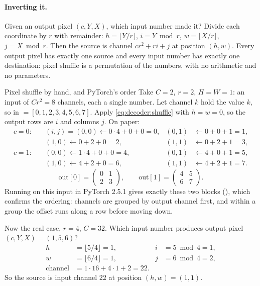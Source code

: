\paragraph{Inverting it.} Given an output pixel $(c, Y, X)$, which input number made it? Divide each
coordinate by $r$ with remainder: $h = \lfloor Y/r \rfloor$, $i = Y \bmod r$, $w = \lfloor X/r \rfloor$,
$j = X \bmod r$. Then the source is channel $c r^2 + r i + j$ at position $(h, w)$. Every output pixel
has exactly one source and every input number has exactly one destination: pixel shuffle is a
permutation of the numbers, with no arithmetic and no parameters.

\begin{worked}[label={we:decoder:shuffle}]{Pixel shuffle by hand, and PyTorch's order}
Take $C = 2$, $r = 2$, $H = W = 1$: an input of $C r^2 = 8$ channels, each a single number. Let channel
$k$ hold the value $k$, so in $= [0, 1, 2, 3, 4, 5, 6, 7]$. Apply \eqref{eq:decoder:shuffle} with $h = w
= 0$, so the output rows are $i$ and columns $j$. On paper:
\begin{align*}
c = 0:&\quad (i,j) = (0,0) \leftarrow 0\cdot 4 + 0 + 0 = 0, & (0,1) &\leftarrow 0 + 0 + 1 = 1,\\
      &\quad (1,0) \leftarrow 0 + 2 + 0 = 2, & (1,1) &\leftarrow 0 + 2 + 1 = 3,\\
c = 1:&\quad (0,0) \leftarrow 1\cdot 4 + 0 + 0 = 4, & (0,1) &\leftarrow 4 + 0 + 1 = 5,\\
      &\quad (1,0) \leftarrow 4 + 2 + 0 = 6, & (1,1) &\leftarrow 4 + 2 + 1 = 7.
\end{align*}
\[
\text{out}[0] = \begin{pmatrix} 0 & 1\\ 2 & 3\end{pmatrix}, \qquad
\text{out}[1] = \begin{pmatrix} 4 & 5\\ 6 & 7\end{pmatrix}.
\]
Running  on this input in PyTorch 2.5.1 gives exactly these two blocks
(), which confirms the ordering: channels are
grouped by output channel first, and within a group the offset runs along a row before moving down.

Now the real case, $r = 4$, $C = 32$. Which input number produces output pixel $(c, Y, X) = (1, 5, 6)$?
\begin{align*}
h &= \lfloor 5/4 \rfloor = 1, & i &= 5 \bmod 4 = 1,\\
w &= \lfloor 6/4 \rfloor = 1, & j &= 6 \bmod 4 = 2,\\
\text{channel} &= 1 \cdot 16 + 4 \cdot 1 + 2 = 22 .
\end{align*}
So the source is input channel 22 at position $(h, w) = (1, 1)$.
\end{worked}

